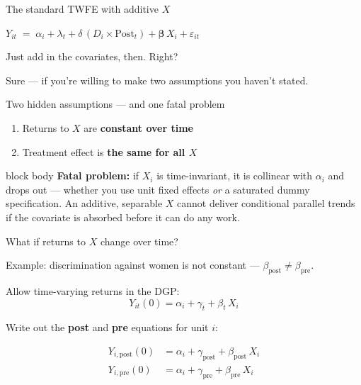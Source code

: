 \documentclass[aspectratio=169,11pt]{beamer}
\newcommand{\emphbox}[1]{%
  \begin{beamercolorbox}[rounded=true,sep=7pt,wd=\linewidth]{block body}%
    \small\color{slate} #1%
  \end{beamercolorbox}}
\begin{document}
\begin{frame}{The standard TWFE with additive $X$}
\vspace{0.6em}
\begin{center}
\large
$Y_{it} \;=\; \alpha_i + \lambda_t
      + \delta\,(D_i \times \mathrm{Post}_t)
      + \boldsymbol{\beta}\,X_i
      + \varepsilon_{it}$
\end{center}
\vspace{1.2em}
\begin{center}
\large Just add in the covariates, then. \;Right?
\end{center}
\vspace{0.8em}
\begin{center}\color{warmgray}
Sure --- if you're willing to make two assumptions you haven't stated.
\end{center}
\end{frame}

\begin{frame}{Two hidden assumptions --- and one fatal problem}
\vspace{0.8em}
\begin{enumerate}\setlength\itemsep{0.6em}
  \item Returns to $X$ are \textbf{constant over time}
  \item Treatment effect is \textbf{the same for all $X$}
\end{enumerate}
\vspace{1em}
\emphbox{\textbf{Fatal problem:} if $X_i$ is time-invariant, it is collinear with $\alpha_i$
and drops out --- whether you use unit fixed effects \emph{or} a saturated dummy
specification. An additive, separable $X$ cannot deliver conditional parallel
trends if the covariate is absorbed before it can do any work.}
\end{frame}

\begin{frame}{What if returns to $X$ change over time?}
\vspace{0.3em}
\begin{center}\color{warmgray}\small
Example: discrimination against women is not constant --- $\beta_{\text{post}} \neq \beta_{\text{pre}}$.
\end{center}
\vspace{0.4em}

Allow time-varying returns in the DGP:
\[
Y_{it}(0) = \alpha_i + \gamma_t + \beta_t\, X_i
\]

Write out the \textbf{post} and \textbf{pre} equations for unit $i$:

\begin{align*}
Y_{i,\text{post}}(0) &= \alpha_i + \gamma_{\text{post}} + \beta_{\text{post}}\, X_i \\[4pt]
Y_{i,\text{pre}}(0)  &= \alpha_i + \gamma_{\text{pre}}  + \beta_{\text{pre}}\,  X_i
\end{align*}

\end{frame}
\end{document}
